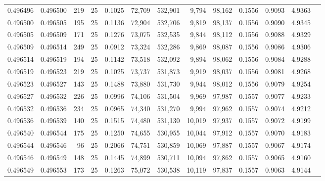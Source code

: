 \begin{tabular}{rrrrrrrrrrrrr}
0.496496 & 0.496500 & 219 &  25 &                                     0.1025 &  72,709 & 532,901 &   9,794 &  98,162 & 0.1556 & 0.9093 & 4.9363 \\
0.496500 & 0.496505 & 195 &  25 &                                     0.1136 &  72,904 & 532,706 &   9,819 &  98,137 & 0.1556 & 0.9090 & 4.9345 \\
0.496505 & 0.496509 & 171 &  25 &                                     0.1276 &  73,075 & 532,535 &   9,844 &  98,112 & 0.1556 & 0.9088 & 4.9329 \\
0.496509 & 0.496514 & 249 &  25 &                                     0.0912 &  73,324 & 532,286 &   9,869 &  98,087 & 0.1556 & 0.9086 & 4.9306 \\
0.496514 & 0.496519 & 194 &  25 &                                     0.1142 &  73,518 & 532,092 &   9,894 &  98,062 & 0.1556 & 0.9084 & 4.9288 \\
0.496519 & 0.496523 & 219 &  25 &                                     0.1025 &  73,737 & 531,873 &   9,919 &  98,037 & 0.1556 & 0.9081 & 4.9268 \\
0.496523 & 0.496527 & 143 &  25 &                                     0.1488 &  73,880 & 531,730 &   9,944 &  98,012 & 0.1556 & 0.9079 & 4.9254 \\
0.496527 & 0.496532 & 226 &  25 &                                     0.0996 &  74,106 & 531,504 &   9,969 &  97,987 & 0.1557 & 0.9077 & 4.9233 \\
0.496532 & 0.496536 & 234 &  25 &                                     0.0965 &  74,340 & 531,270 &   9,994 &  97,962 & 0.1557 & 0.9074 & 4.9212 \\
0.496536 & 0.496539 & 140 &  25 &                                     0.1515 &  74,480 & 531,130 &  10,019 &  97,937 & 0.1557 & 0.9072 & 4.9199 \\
0.496540 & 0.496544 & 175 &  25 &                                     0.1250 &  74,655 & 530,955 &  10,044 &  97,912 & 0.1557 & 0.9070 & 4.9183 \\
0.496544 & 0.496546 &  96 &  25 &                                     0.2066 &  74,751 & 530,859 &  10,069 &  97,887 & 0.1557 & 0.9067 & 4.9174 \\
0.496546 & 0.496549 & 148 &  25 &                                     0.1445 &  74,899 & 530,711 &  10,094 &  97,862 & 0.1557 & 0.9065 & 4.9160 \\
0.496549 & 0.496553 & 173 &  25 &                                     0.1263 &  75,072 & 530,538 &  10,119 &  97,837 & 0.1557 & 0.9063 & 4.9144 \\

\end{tabular}
